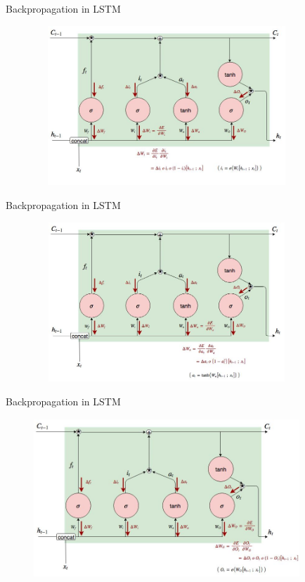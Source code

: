 \documentclass{beamer}
\begin{document}
\begin{frame}{Backpropagation in LSTM}
\begin{figure}
\includegraphics[width=10cm, height=6cm]{lstm_backpropagation_3_3.jpg}
\end{figure}
\end{frame}


\begin{frame}{Backpropagation in LSTM}
\begin{figure}
\includegraphics[width=10cm, height=6cm]{lstm_backpropagation_3_4.jpg}
\end{figure}
\end{frame}


\begin{frame}{Backpropagation in LSTM}
\begin{figure}
\includegraphics[width=10cm, height=6cm]{lstm_backpropagation_3_5.jpg}
\end{figure}
\end{frame}
\end{document}
